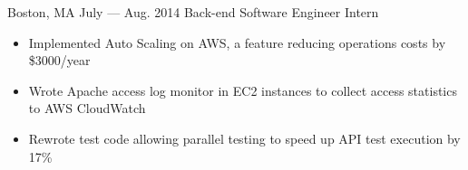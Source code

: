 \documentclass{resume}
\begin{document}
\begin{body}
	{Boston, MA}
	{July --- Aug. 2014}
	{Back-end Software Engineer Intern}
	\begin{itemize}[noitemsep,topsep=0pt]
		\item Implemented Auto Scaling on AWS, a feature reducing operations costs by \$3000/year
		\item Wrote Apache access log monitor in EC2 instances to collect access statistics to AWS CloudWatch
		\item Rewrote test code allowing parallel testing to speed up API test execution by 17\%
	\end{itemize}
\end{body}

\smallskip

\end{document}
